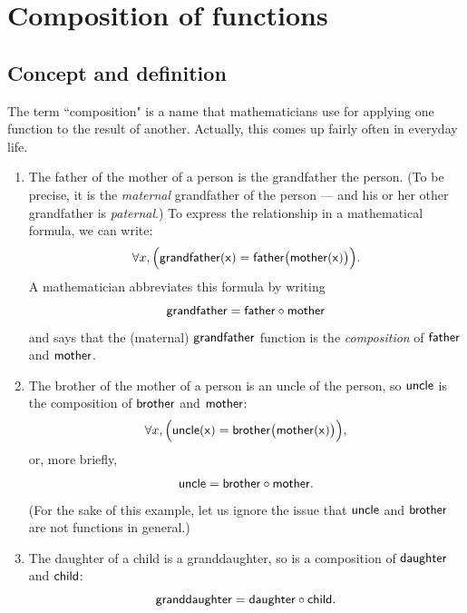  
  
 \section{Composition of functions}
 
 \subsection{Concept and definition}


\medskip\noindent
The term ``composition" is a name that mathematicians use for applying one function to the result of another. Actually, this  comes up fairly often in everyday life.

\begin{example}{} 
\begin{enumerate}
\item The father of the mother of a person is the grandfather the person.
 (To be precise, it is the \emph{maternal} grandfather of the person --- and his or her other grandfather is \emph{paternal}.) To express the relationship in a mathematical formula, we can write:
 $$ \forall x,  \Bigl( \sf{grandfather}(x) = \sf{father} \bigl( \sf{mother}(x) \bigr) \Bigr) .$$
 A mathematician abbreviates this formula by writing
 $$ \sf{grandfather} = \sf{father} \circ \sf{mother} $$
 and says that the (maternal) $\sf{grandfather}$ function is the \emph{composition} of $\sf{father}$ and $\sf{mother}$.
 \item The brother of the mother of a person is an uncle of the person, so $\sf{uncle}$ is the composition of $\sf{brother}$ and $\sf{mother}$:
  $$ \forall x, \Bigl( \sf{uncle}(x) = \sf{brother} \bigl( \sf{mother}(x) \bigr) \Bigr) ,$$ 
  or, more briefly,
  $$ \sf{uncle} = \sf{brother} \circ \sf{mother} .$$
 (For the sake of this example, let us ignore the issue that $\sf{uncle}$ and $\sf{brother}$ are not functions in general.)
\item The daughter of a child is a granddaughter, so  is a composition of $\sf{daughter}$ and $\sf{child}$:
$$ \sf{granddaughter} = \sf{daughter} \circ \sf{child} .$$
\end{enumerate}
\end{example}


